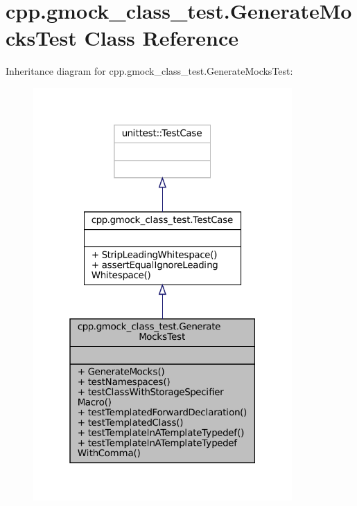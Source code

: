 \hypertarget{classcpp_1_1gmock__class__test_1_1GenerateMocksTest}{}\section{cpp.\+gmock\+\_\+class\+\_\+test.\+Generate\+Mocks\+Test Class Reference}
\label{classcpp_1_1gmock__class__test_1_1GenerateMocksTest}


Inheritance diagram for cpp.\+gmock\+\_\+class\+\_\+test.\+Generate\+Mocks\+Test\+:
\nopagebreak
\begin{figure}[H]
\begin{center}
\leavevmode
\includegraphics[width=280pt]{classcpp_1_1gmock__class__test_1_1GenerateMocksTest__inherit__graph}
\end{center}
\end{figure}


